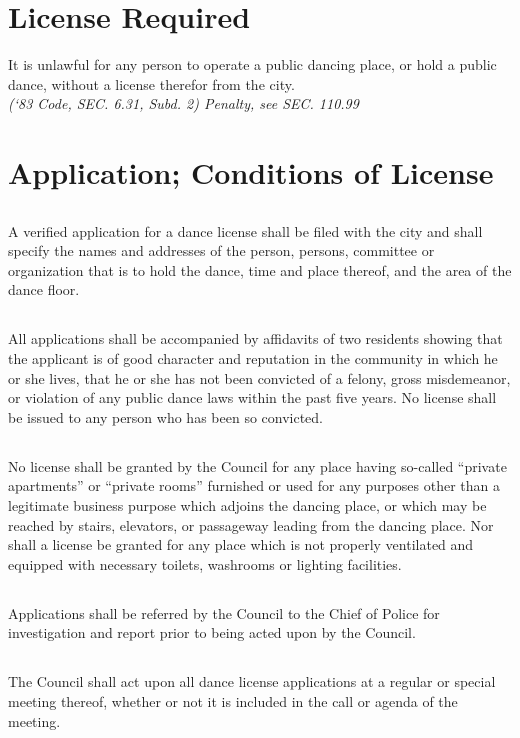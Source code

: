 \section{License Required}
It is unlawful for any person to operate a public dancing place, or hold a public dance, without a license therefor from the city.\\
\emph{(‘83 Code, SEC. 6.31, Subd. 2)  Penalty, see SEC. 110.99}
\section{Application; Conditions of License}
\subsection{}
A verified application for a dance license shall be filed with the city and shall specify the names and addresses of the person, persons, committee or organization that is to hold the dance, time and place thereof, and the area of the dance floor.
\subsection{}
All applications shall be accompanied by affidavits of two residents showing that the applicant is of good character and reputation in the community in which he or she lives, that he or she has not been convicted of a felony, gross misdemeanor, or violation of any public dance laws within the past five years.  No license shall be issued to any person who has been so convicted.
\subsection{}
No license shall be granted by the Council for any place having so-called “private apartments” or “private rooms” furnished or used for any purposes other than a legitimate business purpose which adjoins the dancing place, or which may be reached by stairs, elevators, or passageway leading from the dancing place.  Nor shall a license be granted for any place which is not properly ventilated and equipped with necessary toilets, washrooms or lighting facilities.
\subsection{}
Applications shall be referred by the Council to the Chief of Police for investigation and report prior to being acted upon by the Council.
\subsection{}
The Council shall act upon all dance license applications at a regular or special meeting thereof, whether or not it is included in the call or agenda of the meeting.
